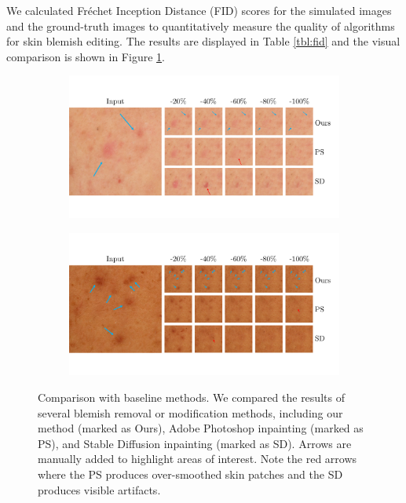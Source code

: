 \begin{spacing}{1.5}
We calculated Fréchet Inception Distance (FID) scores for the simulated images and the ground-truth images to quantitatively measure the quality of algorithms for skin blemish editing. The results are displayed in Table \ref{tbl:fid} and the visual comparison is shown in Figure \ref{fig:baseline}.
\begin{figure}[t!]
    \centering
    \begin{subfigure}{.9\textwidth}
        \centering
        \includegraphics[width=\linewidth]{Chapter5/baseline11.pdf}
    \end{subfigure}
    \hfill
    \begin{subfigure}{.9\textwidth}
        \centering
        \includegraphics[width=\linewidth]{Chapter5/baseline12.pdf}
    \end{subfigure}
    \caption{Comparison with baseline methods. We compared the results of several blemish removal or modification methods, including our method (marked as Ours), Adobe Photoshop\cite{adobephotoshop} inpainting (marked as PS), and Stable Diffusion\cite{rombach2021highresolution} inpainting (marked as SD). Arrows are manually added to highlight areas of interest. Note the red arrows where the PS produces over-smoothed skin patches and the SD produces visible artifacts.}
    \label{fig:baseline}
\end{figure}


\end{spacing}
